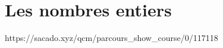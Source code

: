 

% 
% 


% 




\chapter{Les nombres entiers}
{https://sacado.xyz/qcm/parcours_show_course/0/117118}

